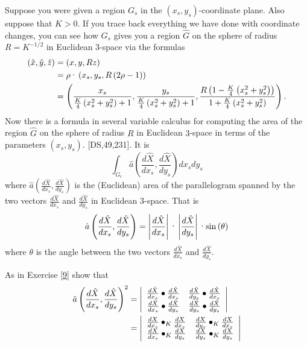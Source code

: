 Suppose you were given a region $G_{s}$ in the $\left(  x_{s},y_{s}\right)
$-coordinate plane. Also suppose that $K>0$. If you trace back everything we
have done with coordinate changes, you can see how $G_{s}$ gives you a region
$\hat{G}$ on the sphere of radius $R=K^{-1/2}$ in Euclidean $3$-space via the
formulas%
\begin{align*}
\left(  \hat{x},\hat{y},\hat{z}\right)   &  =\left(  x,y,Rz\right) \\
&  =\rho\text{\textperiodcentered}\left(  x_{s},y_{s},R\left(  2\rho-1\right)
\right) \\
&  =\left(  \frac{x_{s}}{\frac{K}{4}\left(  x_{s}^{2}+y_{s}^{2}\right)
+1},\frac{y_{s}}{\frac{K}{4}\left(  x_{s}^{2}+y_{s}^{2}\right)  +1}%
,\frac{R\left(  1-\frac{K}{4}\left(  x_{s}^{2}+y_{s}^{2}\right)  \right)
}{1+\frac{K}{4}\left(  x_{s}^{2}+y_{s}^{2}\right)  }\right)  .
\end{align*}
Now there is a formula in several variable calculus for computing the area of
the region $\hat{G}$ on the sphere of radius $R$ in Euclidean $3$-space in
terms of the parameters $\left(  x_{s},y_{s}\right)  $. [DS,49,231]. It is
\[%
{\displaystyle\int\nolimits_{G_{c}}}
\hat{a}\left(  \frac{d\hat{X}}{dx_{s}},\frac{d\hat{X}}{dy_{s}}\right)
dx_{s}dy_{s}%
\]
where $\hat{a}\left(  \frac{d\hat{X}}{dx_{s}},\frac{d\hat{X}}{dy_{s}}\right)
$ is the (Euclidean) area of the parallelogram spanned by the two vectors
$\frac{d\hat{X}}{dx_{s}}$ and $\frac{d\hat{X}}{dy_{s}}$ in Euclidean
$3$-space. That is%
\[
\hat{a}\left(  \frac{d\hat{X}}{dx_{s}},\frac{d\hat{X}}{dy_{s}}\right)
=\left\vert \frac{d\hat{X}}{dx_{s}}\right\vert \text{\textperiodcentered
}\left\vert \frac{d\hat{X}}{dy_{s}}\right\vert \text{\textperiodcentered
}\mathrm{sin}\left(  \theta\right)
\]
where $\theta$ is the angle between the two vectors $\frac{d\hat{X}}{dx_{s}}$
and $\frac{d\hat{X}}{dy_{s}}$.

\begin{exercise}
As in Exercise \ref{9} show that%
\begin{align*}
\hat{a}\left(  \frac{d\hat{X}}{dx_{s}},\frac{d\hat{X}}{dy_{s}}\right)  ^{2}
&  =\left\vert
\begin{array}
[c]{cc}%
\frac{d\hat{X}}{dx_{s}}\bullet\frac{d\hat{X}}{dx_{s}} & \frac{d\hat{X}}%
{dy_{s}}\bullet\frac{d\hat{X}}{dx_{s}}\\
\frac{d\hat{X}}{dx_{s}}\bullet\frac{d\hat{X}}{dy_{s}} & \frac{d\hat{X}}%
{dy_{s}}\bullet\frac{d\hat{X}}{dy_{s}}%
\end{array}
\right\vert \\
&  =\left\vert
\begin{array}
[c]{cc}%
\frac{dX}{dx_{s}}\bullet_{K}\frac{dX}{dx_{s}} & \frac{dX}{dy_{s}}\bullet
_{K}\frac{dX}{dx_{s}}\\
\frac{dX}{dx_{s}}\bullet_{K}\frac{dX}{dy_{s}} & \frac{dX}{dy_{s}}\bullet
_{K}\frac{dX}{dy_{s}}%
\end{array}
\right\vert
\end{align*}

\end{exercise}

